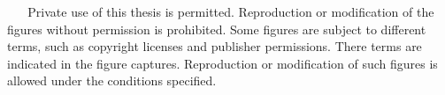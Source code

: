 {%
  \copyrighttext%
  {\copyrightstring\ \allrightsreservedeng}%
  {%
    \copyrightstring\ \allrightsreservedeng
    \blockpar
    Private use of this thesis is permitted. Reproduction or
    modification of the figures without permission is prohibited.
    \blockpar
    Some figures are subject to different terms, such as copyright
    licenses and publisher permissions. There terms are indicated in
    the figure captures. Reproduction or modification of such figures
    is allowed under the conditions specified.
  }
}
